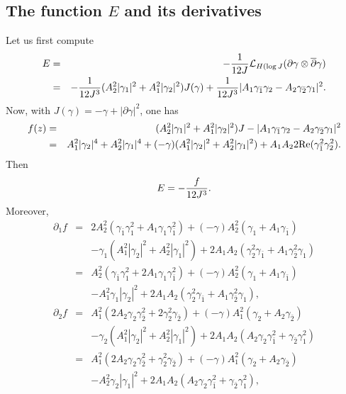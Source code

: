 \documentclass[12pt]{amsart}
\def\d{\partial}
\def\dbar{\overline{\partial}}
\def\d{\partial}
\def\cal{\mathcal}
\begin{document}
\subsection {The function $E$ and its derivatives}
Let us first compute
\begin{eqnarray*}
E&=&-{1\over 12 J} {\cal L}_{H(\log J}(\d \gamma\otimes \dbar \gamma)\nonumber\\
&=&-{1\over 12 J^3} (A_2^2 |\gamma_1|^2+A_1^2 |\gamma_2|^2)J(\gamma)+{1\over 12 J^3}|A_1 \gamma_{\bar1} \gamma_2-A_2\gamma_{\bar2} \gamma_1|^2.\\
\end{eqnarray*}
Now, with $J(\gamma)=-\gamma+|\d \gamma|^2$, one has
\begin{eqnarray*}
f(z)&=& (A_2^2|\gamma_1|^2+A_1^2|\gamma_2|^2) J-|A_1 \gamma_{\bar1} \gamma_2-A_2\gamma_{\bar2} \gamma_1|^2\\
&=& A_1^2|\gamma_2|^4+A_2^2 |\gamma_1|^4+(-\gamma)(A_1^2|\gamma_2|^2+A_2^2|\gamma_1|^2) +A_1A_2  2\hbox{Re}(\gamma_{\bar1}^2\gamma_2^2).
\end{eqnarray*}
Then
\begin{eqnarray}
E=-{f\over 12 J^3}.
\end{eqnarray}
Moreover,
\begin{eqnarray*}
\d_1 f&=&2A_2^2 ( \gamma_{\bar1} \gamma_1^2 +A_1 \gamma_1 \gamma_{\bar1}^2)+(-\gamma) A_2^2 (\gamma_1+A_1 \gamma_{\bar1})\\
&&-\gamma_1(A_1^2|\gamma_2|^2
+A_2^2|\gamma_1|^2)
+2A_1A_2 (\gamma_2^2 \gamma_{\bar1} +A_1 \gamma_{\bar2}^2 \gamma_1)\\
&=&A_2^2 ( \gamma_{\bar1} \gamma_1^2 +2A_1 \gamma_1 \gamma_{\bar1}^2)+(-\gamma) A_2^2 (\gamma_1+A_1 \gamma_{\bar1})\\
&&- A_1^2 \gamma_1|\gamma_2|^2
+2A_1A_2 (\gamma_2^2 \gamma_{\bar1} +A_1 \gamma_{\bar2}^2 \gamma_1),
\end{eqnarray*}
\begin{eqnarray*}
\d_2 f&=&A_1^2  (2 A_2 \gamma_2 \gamma_{\bar2}^2 +2 \gamma_2^2 \gamma_{\bar2}) +(-\gamma) A_1^2  (\gamma_2+A_2 \gamma_{\bar2}) \\
&&-\gamma_2 (A_1^2|\gamma_2|^2+A_2^2|\gamma_1|^2)
+2A_1A_2 ( A_2 \gamma_2 \gamma_{\bar1} ^2+ \gamma_{\bar2} \gamma_1^2)\\
&=&A_1^2  (2 A_2 \gamma_2 \gamma_{\bar2}^2 + \gamma_2^2 \gamma_{\bar2}) +(-\gamma) A_1^2  (\gamma_2+A_2 \gamma_{\bar2}) \\
&&-A_2^2 \gamma_2 |\gamma_1|^2
+2A_1A_2 ( A_2 \gamma_2 \gamma_{\bar1} ^2+ \gamma_{\bar2} \gamma_1^2),
\end{eqnarray*}
\end{document}
